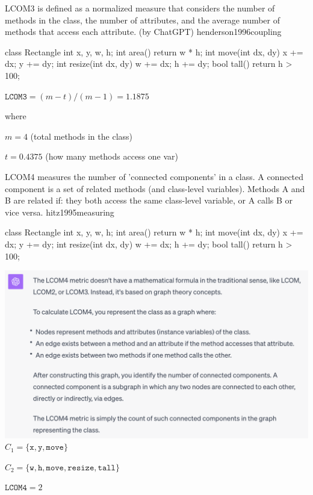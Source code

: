 \documentclass{article}
\begin{document}
  {LCOM3 is defined as a normalized measure that considers the number of methods in the class, the number of attributes, and the average number of methods that access each attribute. (by ChatGPT)}
  {henderson1996coupling}

\begin{multicols}{2}
{\small\begin{ffcode}
class Rectangle {
  int x, y, w, h;
  int area() {
    return w * h; }
  int move(int dx, dy) {
    x += dx; y += dy; }
  int resize(int dx, dy) {
    w += dx; h += dy; }
  bool tall() {
    return h > 100; }
}
\end{ffcode}
}
\par\columnbreak\par
\(\texttt{LCOM3} = (m - t) / ( m - 1) = 1.1875 \)\par
where\par
\( m = 4 \) (total methods in the class) \par
\( t = 0.4375 \) (how many methods access one var) \par
\end{multicols}
\plush{}

  {LCOM4 measures the number of 'connected components' in a class. A connected component is a set of related methods (and class-level variables). Methods A and B are related if: they both access the same class-level variable, or A calls B or vice versa.}
  {hitz1995measuring}

\begin{multicols}{2}
{\small\begin{ffcode}
class Rectangle {
  int x, y, w, h;
  int area() {
    return w * h; }
  int move(int dx, dy) {
    x += dx; y += dy; }
  int resize(int dx, dy) {
    w += dx; h += dy; }
  bool tall() {
    return h > 100; }
}
\end{ffcode}
}
\par\columnbreak\par
\includegraphics[width=\columnwidth]{lcom4-gpt.png}
\(C_1 = \{ \texttt{x}, \texttt{y}, \texttt{move} \} \)\par
\(C_2 = \{ \texttt{w}, \texttt{h}, \texttt{move}, \texttt{resize}, \texttt{tall} \} \)\par
\(\texttt{LCOM4} = 2 \)\par
\end{multicols}
\plush{}
\end{document}
